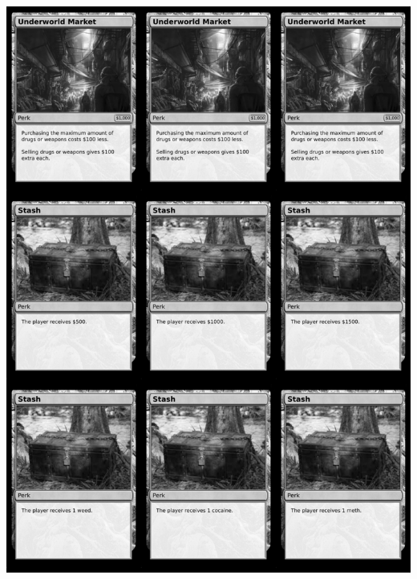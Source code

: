 \documentclass[a4paper]{article}
\begin{document}
\begin{center}
	\centering
	\includegraphics[width=190.5mm,height=266.7mm]{output/temp/page27.png}
\end{center}

\newpage
\end{document}
